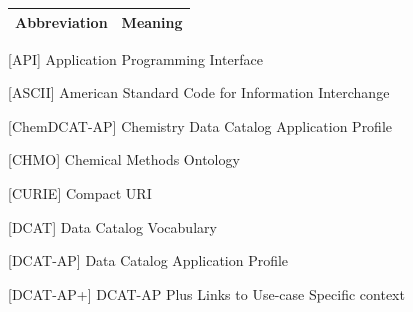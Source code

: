 \begingroup

\newlength{\abbreviationlabelwidth}
\newlength{\abbreviationcolumnsep}

\setlength{\abbreviationlabelwidth}{0.20\textwidth}
\setlength{\abbreviationcolumnsep}{1.5em}

\renewcommand*{\aclabelfont}[1]{\normalfont #1}

\setlength{\parskip}{0pt}

\setlength{\labelsep}{\abbreviationcolumnsep}

\begin{singlespace}

\noindent
\begin{tabularx}{\textwidth}{
    @{}
    p{\dimexpr\abbreviationlabelwidth+\abbreviationcolumnsep\relax}
    @{}
    X
    @{}
}
    \toprule
    \textbf{Abbreviation} & \textbf{Meaning} \\
    \midrule
\end{tabularx}

\vspace{0.35\baselineskip}

\begin{acronym}[\rule{\abbreviationlabelwidth}{0pt}]

    \setlength{\itemsep}{0.55\baselineskip}
    \setlength{\parsep}{0pt}

    [API]
        {Application Programming Interface}

    [ASCII]
        {American Standard Code for Information Interchange}

    [ChemDCAT-AP]
        {Chemistry Data Catalog Application Profile}

    [CHMO]
        {Chemical Methods Ontology}

    [CURIE]
        {Compact URI}

    [DCAT]
        {Data Catalog Vocabulary}

    [DCAT-AP]
        {Data Catalog Application Profile}

    [DCAT-AP+]
        {DCAT-AP Plus Links to Use-case Specific context}


\end{acronym}
\end{singlespace}

